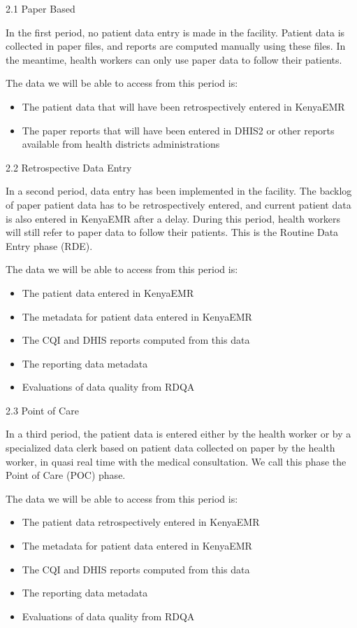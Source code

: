 \documentclass[a4paper,11pt,final,twoside]{article}
\begin{document}
2.1	Paper Based

In the first period, no patient data entry is made in the facility. Patient data is collected in paper files, and reports are computed manually using these files. In the meantime, health workers can only use paper data to follow their patients.

The data we will be able to access from this period is:
\begin{itemize}
\item	The patient data that will have been retrospectively entered in KenyaEMR
\item	The paper reports that will have been entered in DHIS2 or other reports available from health districts administrations
\end{itemize}

2.2	Retrospective Data Entry

In a second period, data entry has been implemented in the facility. The backlog of paper patient data has to be retrospectively entered, and current patient data is also entered in KenyaEMR after a delay. During this period, health workers will still refer to paper data to follow their patients. This is the Routine Data Entry phase (RDE).

The data we will be able to access from this period is:
\begin{itemize}
\item	The patient data entered in KenyaEMR
\item	The metadata for patient data entered in KenyaEMR
\item	The CQI and DHIS reports computed from this data
\item	The reporting data metadata
\item	Evaluations of data quality from RDQA
\end{itemize}

2.3	Point of Care

In a third period, the patient data is entered either by the health worker or by a specialized data clerk based on patient data collected on paper by the health worker, in quasi real time with the medical consultation. We call this phase the Point of Care (POC) phase.

The data we will be able to access from this period is:
\begin{itemize}
\item	The patient data retrospectively entered in KenyaEMR
\item	The metadata for patient data entered in KenyaEMR
\item	The CQI and DHIS reports computed from this data
\item	The reporting data metadata
\item	Evaluations of data quality from RDQA
\end{itemize}
\end{document}
